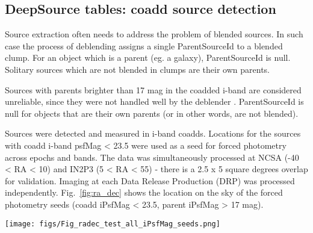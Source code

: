 \documentclass[fleqn,usenatbib]{mnras}  %
\begin{document}
\subsection{DeepSource tables: coadd source detection}


Source extraction often needs to address the problem of blended sources.  In such case the process of deblending assigns a single ParentSourceId to a blended clump. For an object which is a parent (eg. a galaxy), ParentSourceId is null.  Solitary sources which are not blended  in clumps are their own parents. 

Sources with parents brighter than  17 mag in the coadded i-band are considered unreliable, since they were not handled well by the deblender . ParentSourceId is null for objects that are their own parents (or in other words, are not blended). 

Sources were detected and measured in i-band coadds. Locations for the  sources with coadd i-band psfMag < 23.5  were used as a seed for forced photometry across epochs and bands. The data was simultaneously processed at NCSA (-40 < RA < 10) and IN2P3 (5 < RA < 55) - there is a 2.5 x 5 square degrees overlap for validation. Imaging at each Data Release Production (DRP)  was processed independently.  Fig.~\ref{fig:ra_dec} shows the location on the sky of the forced photometry seeds (coadd  iPsfMag < 23.5, parent iPsfMag > 17 mag). 




\begin{figure*}
\texttt{[image: figs/Fig\_radec\_test\_all\_iPsfMag\_seeds.png]}
\caption{Combined NCSA (left) and IN2P3 (right) i-band forced photometry seeds. Apart from requiring these primary sources  to have  the coadd magnitude iPsfMag < 23.5, and have parents fainter than 17 mag, there are no other cuts applied to the  9491361 objects shown.  In particular, for NCSA of 5474350 sources we remove 585920 with parents brighter than 17 mag, and for IN2P3 of 4998901 sources we remove 395970. This leaves 4888430 objects in NCSA, and 4602931 in IN2P3, so that in total we have 9491361 objects. One can clearly see the 2.5x5 degrees overlap region (which has a higher source density). To aid plotting so many objects we subsampled  25\% of all objects  : randomness ensures that all spatial features are preserved. There are some regions where there are no objects satisfying our criteria, seen here as blank spots. In particular, region around ra=323.36258, dec=-0.82325 is an M2 globular cluster, and the sheer stellar density prevented from using any sources there as seeds. }
\label{fig:ra_dec}
\end{figure*}
\end{document}
